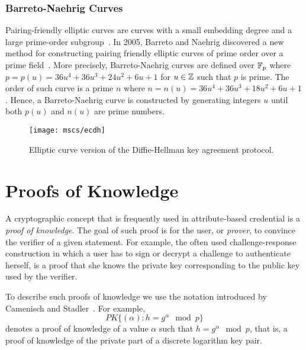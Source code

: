 \subsubsection{Barreto-Naehrig Curves\label{sec:BN}}

Pairing-friendly elliptic curves are curves with a small embedding degree and a
large prime-order subgroup~\cite{FreemanST2010}. In 2005, Barreto and Naehrig
discovered a new method
for constructing pairing friendly elliptic curves of prime order over a prime
field~\cite{BN06}. More precisely, Barreto-Naehrig curves are defined over
$\mathbb{F}_{p}$ where $p = p(u) = 36 u^4 + 36 u^3 + 24 u^2 + 6 u + 1$ for $u \in \mathbb{Z}$
such that $p$ is prime. The order of such curve is a prime $n$ where
$n = n(u) = 36 u^4 + 36 u^3 + 18 u^2 + 6 u + 1$. Hence, a Barreto-Naehrig curve
is constructed by generating integers $u$ until both $p(u)$ and $n(u)$ are prime
numbers.

\begin{figure}[t]
  \centering
  \texttt{[image: mscs/ecdh]}
  \caption{Elliptic curve version of the Diffie-Hellman key agreement protocol.}
  \label{msc:ECDH}
\end{figure}


\section{Proofs of Knowledge}

A cryptographic concept that is frequently used in attribute-based credential is
a \emph{proof of knowledge}. The goal of such proof is for the user, or
\emph{prover}, to convince the verifier of a given statement. For example, the
often used challenge-response construction in which a user has to sign or
decrypt a challenge to authenticate herself, is a proof that she knows the
private key corresponding to the public key used by the verifier.

To describe such proofs of knowledge we use the notation introduced by Camenisch
and Stadler~\cite{CamenischStadler1997}. For example,
\begin{equation*}
  PK\{(\alpha) : h = g^{\alpha} \mod p \}
\end{equation*}
denotes a proof of knowledge of a value $\alpha$ such that $h = g^{\alpha} \mod p$,
that is, a proof of knowledge of the private part of a discrete logarithm key
pair.

